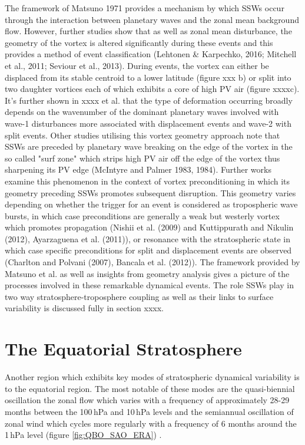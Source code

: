 The framework of Matsuno 1971 provides a mechanism by which SSWs occur through the interaction between planetary waves and the zonal mean background flow. However, further studies show that as well as zonal mean disturbance, the geometry of the vortex is altered significantly during these events and this provides a method of event classification (Lehtonen & Karpechko, 2016; Mitchell et al., 2011; Seviour et al., 2013). During events, the vortex can either be displaced from its stable centroid to a lower latitude (figure xxx b) or split into two daughter vortices each of which exhibits a core of high PV air (figure xxxxc). It's further shown in xxxx et al. that the type of deformation occurring broadly depends on the wavenumber of the dominant planetary waves involved with wave-1 disturbances more associated with displacement events and wave-2 with split events. Other studies utilising this vortex geometry approach note that SSWs are preceded by planetary wave breaking on the edge of the vortex in the so called "surf zone" which strips high PV air off the edge of the vortex thus sharpening its PV edge (McIntyre and Palmer 1983, 1984). Further works examine this phenomenon in the context of vortex preconditioning in which its geometry preceding SSWs promotes subsequent disruption. This geometry varies depending on whether the trigger for an event is considered as tropospheric wave bursts, in which case preconditions are generally a weak but westerly vortex which promotes propagation (Nishii et al. (2009) and Kuttippurath and Nikulin (2012),  Ayarzaguena et al. (2011)), or resonance with the stratospheric state in which case specific preconditions for split and displacement events are observed (Charlton and Polvani (2007), Bancala et al. (2012)). The framework provided by Matsuno et al. as well as insights from geometry analysis gives a picture of the processes involved in these remarkable dynamical events. The role SSWs play in two way stratosphere-troposphere coupling as well as their links to surface variability is discussed fully in section xxxx.


\section{The Equatorial Stratosphere}\label{sec:equatorial_strat}
Another region which exhibits key modes of stratospheric dynamical variability is to the equatorial region. The most notable of these modes are the quasi-biennial oscillation the zonal flow which varies with a frequency of approximately 28-29 months between the 100\,hPa and 10\,hPa levels and the semiannual oscillation of zonal wind which cycles more regularly with a frequency of 6 months around the 1\,hPa level (figure \ref{fig:QBO_SAO_ERA}) \citep{Baldwin2001}.

